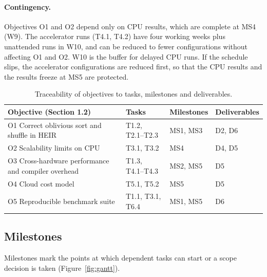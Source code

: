 \paragraph{Contingency.} Objectives O1 and O2 depend only on CPU results, which are complete at MS4 (W9). The accelerator runs (T4.1, T4.2) have four working weeks plus unattended runs in W10, and can be reduced to fewer configurations without affecting O1 and O2. W10 is the buffer for delayed CPU runs. If the schedule slips, the accelerator configurations are reduced first, so that the CPU results and the results freeze at MS5 are protected.

\begin{table}[H]
\centering
\small
\caption{Traceability of objectives to tasks, milestones and deliverables.}
\label{tab:trace}
\begin{tabularx}{\textwidth}{>{\raggedright\arraybackslash}X l l l}
\toprule
\textbf{Objective (Section 1.2)} & \textbf{Tasks} & \textbf{Milestones} & \textbf{Deliverables}\\
\midrule
O1 Correct oblivious sort and shuffle in HEIR & T1.2, T2.1--T2.3 & MS1, MS3 & D2, D6\\
O2 Scalability limits on CPU & T3.1, T3.2 & MS4 & D4, D5\\
O3 Cross-hardware performance and compiler overhead & T1.3, T4.1--T4.3 & MS2, MS5 & D5\\
O4 Cloud cost model & T5.1, T5.2 & MS5 & D5\\
O5 Reproducible benchmark suite & T1.1, T3.1, T6.4 & MS1, MS5 & D6\\
\bottomrule
\end{tabularx}
\end{table}

\subsection{Milestones}\label{sec:milestones} %

Milestones mark the points at which dependent tasks can start or a scope decision is taken (Figure~\ref{fig:gantt}).

